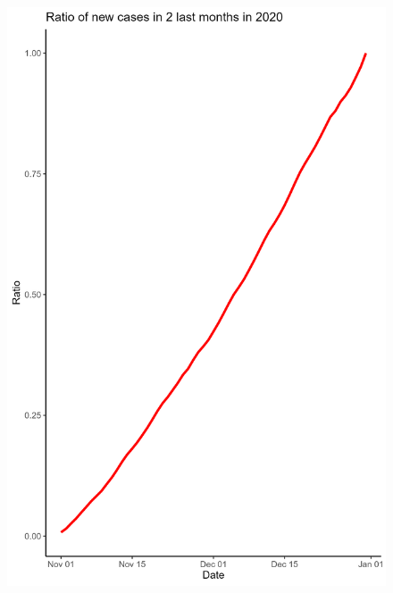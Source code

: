 \documentclass[a4paper]{article}
\theoremstyle{definition}
\begin{document}
\begin{enumerate}[i)]
\begin{enumerate}[1]
\begin{figure}[H]
				\includegraphics[scale=0.2]{images/7.5.1.png}
			\end{figure}
			\begin{figure}[H]
				\centering

\end{figure}
\end{enumerate}
\end{enumerate}
\end{document}
